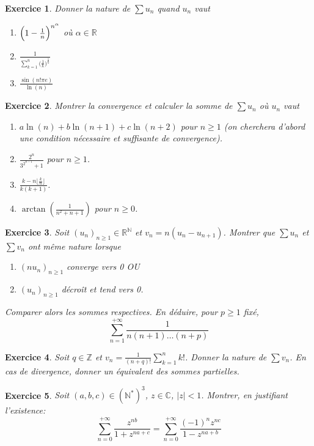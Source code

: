 \documentclass[12pt]{article}
\newtheorem{exercise}{Exercice}[section]
\theoremstyle{remark}
\theoremstyle{remark}
\newcommand{\R}{\mathbb{R}}
\newcommand{\C}{\mathbb{C}}
\newcommand{\N}{\mathbb{N}}
\newcommand{\Z}{\mathbb{Z}}
\begin{document}
\begin{exercise}
	Donner la nature de $\sum u_{n}$ quand $u_{n}$ vaut
	\begin{enumerate}
		\item $\Bigl(1-\frac{1}{n}\Bigr)^{n^{\alpha}}$ où $\alpha\in\R$
		\item $\frac{1}{\sum_{k=1}^{n}\bigl(\frac{1}{k}\bigr)^{\frac{1}{k}}}$
		\item $\frac{\sin(n!\pi e)}{\ln(n)}$
	\end{enumerate}
\end{exercise}

\begin{exercise}
	Montrer la convergence et calculer la somme de $\sum u_{n}$ où $u_{n}$ vaut
	\begin{enumerate}
		\item $a\ln(n)+b\ln(n+1)+c\ln(n+2)$ pour $n\geqslant1$ (on cherchera d'abord une condition
		nécessaire et suffisante de convergence).
		\item $\frac{2^{n}}{3^{2^{n-1}}+1}$ pour $n\geqslant 1$.
		\item $\frac{k-n\lfloor\frac{k}{n}\rfloor}{k(k+1)}$.
		\item $\arctan(\frac{1}{n^{2}+n+1})$ pour $n\geqslant0$.
	\end{enumerate}
\end{exercise}

\begin{exercise}
	Soit $(u_{n})_{n\geqslant1}\in\R^{\N}$ et $v_{n}=n(u_{n}-u_{n+1})$. Montrer
	que $\sum u_{n}$ et $\sum v_{n}$ ont même nature lorsque
	\begin{enumerate}
		\item [(i)] $(nu_{n})_{n\geqslant1}$ converge vers 0 OU
		\item [(ii)] $(u_{n})_{n\geqslant 1}$ décroît et tend vers 0.
	\end{enumerate}
	Comparer alors les sommes respectives. En déduire, pour $p\geqslant1$ fixé,
	$$\sum_{n=1}^{+\infty}\frac{1}{n(n+1)\dots(n+p)}$$
\end{exercise}

\begin{exercise}
	Soit $q\in\Z$ et $v_{n}=\frac{1}{(n+q)!}\sum_{k=1}^{n}k!$. Donner la nature
	de $\sum v_{n}$. En cas de divergence, donner un équivalent des sommes partielles.
\end{exercise}

\begin{exercise}
	Soit $(a,b,c)\in (\N^{*})^{3}$, $z\in\C$, $\vert z\vert<1$. Montrer, en
	justifiant l'existence:
	$$\sum_{n=0}^{+\infty}\frac{z^{nb}}{1+z^{na+c}}=\sum_{n=0}^{+\infty}\frac{(-1)^{n}z^{nc}}{1-z^{na+b}}$$
\end{exercise}
\end{document}
